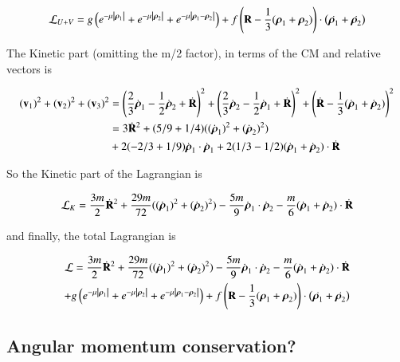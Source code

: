 \documentclass{article}
\newcommand{\Brho}[0]{\boldsymbol{\rho}}
\newcommand{\LL}[0]{\mathcal{L}}
\newcommand{\Abs}[1]{\left\lvert{#1}\right\rvert}
\begin{document}
\begin{equation*}
\LL_{U+V} =
g \left( e^{-\mu \Abs{\Brho_1}} + e^{-\mu \Abs{\Brho_2}} + e^{-\mu \Abs{ \Brho_1 - \Brho_2 }} \right)
+ f \left(\BR - \inv{3}(\Brho_1 + \Brho_2) \right) \cdot \left( \dot{\Brho_1} + \dot{\Brho_2} \right)
\end{equation*}

The Kinetic part (omitting the m/2 factor), in terms of the CM and relative vectors is

\begin{align*}
(\Bv_1)^2 
+(\Bv_2)^2 
+(\Bv_3)^2 %
&= \left(\frac{2}{3} \dot{\Brho}_1 - \inv{2} \dot{\Brho}_2 + \dot{\BR}\right)^2 + \left(\frac{2}{3} \dot{\Brho}_2 - \inv{2} \dot{\Brho}_1 + \dot{\BR}\right)^2 + \left(\dot{\BR} - \inv{3}(\dot{\Brho}_1 + \dot{\Brho}_2)\right)^2 \\
&=
 3 \dot{\BR}^2 + (5/9 + 1/4) ((\dot{\Brho}_1)^2 + (\dot{\Brho}_2)^2 ) \\
&+ 2 (-2/3 + 1/9) \dot{\Brho}_1 \cdot \dot{\Brho}_1 
+ 2 (1/3-1/2) (\dot{\Brho}_1 + \dot{\Brho}_2) \cdot \dot{\BR}  \\
\end{align*}

So the Kinetic part of the Lagrangian is

\begin{align*}
\LL_K &= \frac{3m}{2} \dot{\BR}^2 + \frac{29 m}{72} ((\dot{\Brho}_1)^2 + (\dot{\Brho}_2)^2 ) 
- \frac{5 m}{9} \dot{\Brho}_1 \cdot \dot{\Brho}_2 
- \frac{m}{6} (\dot{\Brho}_1 + \dot{\Brho}_2) \cdot \dot{\BR}  \\
\end{align*}

and finally, the total Lagrangian is

\begin{align*}
\LL =
\frac{3m}{2} \dot{\BR}^2 + \frac{29 m}{72} ((\dot{\Brho}_1)^2 + (\dot{\Brho}_2)^2 ) 
- \frac{5 m}{9} \dot{\Brho}_1 \cdot \dot{\Brho}_2 
- \frac{m}{6} (\dot{\Brho}_1 + \dot{\Brho}_2) \cdot \dot{\BR}  \\
+g \left( e^{-\mu \Abs{\Brho_1}} + e^{-\mu \Abs{\Brho_2}} + e^{-\mu \Abs{ \Brho_1 - \Brho_2 }} \right)
+ f \left(\BR - \inv{3}(\Brho_1 + \Brho_2) \right) \cdot \left( \dot{\Brho_1} + \dot{\Brho_2} \right)
\end{align*}

\subsection{ Angular momentum conservation? }
\end{document}

